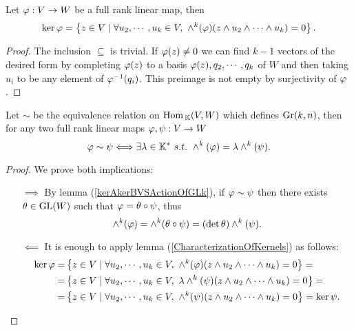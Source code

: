 \begin{lemma}\label{CharacterizationOfKernels}
Let $\varphi:V\to W$ be a full rank linear map, then
\[\ker\varphi=\left\{{z\in V\mid \forall u_2,\cdots, u_k\in V,\ \wedge^k(\varphi)(z\wedge u_2\wedge\cdots\wedge u_k)=0}\right\}.\]
\end{lemma}
\begin{proof}
The inclusion $\subseteq$ is trivial. If $\varphi(z)\neq 0$ we can find $k-1$ vectors of the desired form by completing $\varphi(z)$ to a basis $\varphi(z),q_2,\cdots,q_k$ of $W$ and then taking $u_i$ to be any element of $\varphi^{-1}(q_i)$. This preimage is not empty by surjectivity of $\varphi$.
\end{proof}

\begin{proposition}\label{PluckerMapInjectiveOnGrassmanniansUpToScalar}
Let $\sim$ be the equivalence relation on $\mathrm{Hom}\,_{\mathbb{K}}(V,W)$ which defines $\mathrm{Gr}(k,n)$, then for any two full rank linear maps $\varphi,\psi:V\to W$
\[\vp\sim \psi\coimplies \exists \la\in\K^\ast\ s.t.\ \wedge^k(\vp)=\la\wedge^k(\psi).\]
\end{proposition}
\begin{proof}
We prove both implications:
\setlength{\leftmargini}{0cm}
\begin{itemize}
\item[$\boxed{\implies}$] By lemma (\ref{kerAkerBVSActionOfGLk}), if $\varphi\sim \psi$ then there exists $\theta\in \mathrm{GL}(W)$ such that $\varphi=\theta\circ \psi$, thus
\[\wedge^k(\varphi)=\wedge^k(\theta\circ \psi)=(\det\theta) \wedge^k(\psi).\]
\item[$\boxed{\impliedby}$] It is enough to apply lemma (\ref{CharacterizationOfKernels}) as follows:
\begin{align*}
\ker\vp=&\cpa{z\in V\mid \forall u_2,\cdots, u_k\in V,\ \wedge^k(\vp)(z\wedge u_2\wedge \cdots\wedge u_k)=0}=\\
=&\cpa{z\in V\mid \forall u_2,\cdots, u_k\in V,\ \la\wedge^k(\psi)(z\wedge u_2\wedge\cdots\wedge u_k)=0}=\\
=&\cpa{z\in V\mid \forall u_2,\cdots, u_k\in V,\ \wedge^k(\psi)(z\wedge u_2\wedge \cdots\wedge u_k)=0}=\ker \psi.
\end{align*}
\end{itemize}
\setlength{\leftmargini}{0.5cm}
\end{proof}



